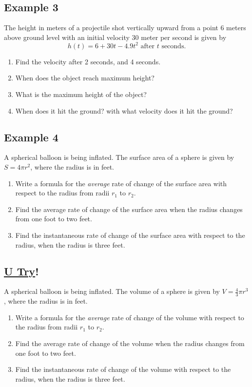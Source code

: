 \documentclass[10pt]{book}
\theoremstyle{definition}
\begin{document}
\subsection*{Example 3} The height in meters of a projectile shot vertically upward from a point 6 meters above ground level with an initial velocity 30 meter per second is given by 
\[
h(t)=6+30t-4.9t^2\textrm{ after $t$ seconds.}
\]
\begin{enumerate}[label=(\alph*)]
    \item Find the velocity after 2 seconds, and 4 seconds.\vspace{3cm}
    \item When does the object reach maximum height?\vspace{3cm}
    \item What is the maximum height of the object?\vspace{3cm}
    \item When does it hit the ground? with what velocity does it hit the ground?\vspace{3cm}
\end{enumerate}
\clearpage
\subsection*{Example 4} A spherical balloon is being inflated. The surface area of a sphere is given by $S=4\pi r^2$, where the radius is in feet.
\begin{enumerate}[label=(\alph*)]
    \item Write a formula for the \textit{average} rate of change of the surface area with respect to the radius from radii $r_1$ to $r_2$.\vspace{2.5cm}
    \item Find the average rate of change of the surface area when the radius changes from one foot to two feet.\vspace{2.5cm}
    \item Find the instantaneous rate of change of the surface area with respect to the radius, when the radius is three feet.\vspace{2cm}
\end{enumerate}
\subsection*{\underline{U Try}!} A spherical balloon is being inflated. The volume of a sphere is given by $V=\frac{4}{3}\pi r^3$, where the radius is in feet.
\begin{enumerate}[label=(\alph*)]
    \item Write a formula for the \textit{average} rate of change of the volume with respect to the radius from radii $r_1$ to $r_2$.\vspace{2.5cm}
    \item Find the average rate of change of the volume when the radius changes from one foot to two feet.\vspace{2cm}
    \item Find the instantaneous rate of change of the volume with respect to the radius, when the radius is three feet.
\end{enumerate}
\end{document}
